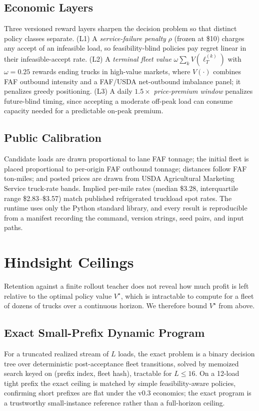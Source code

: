 \documentclass[numbered]{trbunofficial}
\begin{document}
\subsection{Economic Layers}
Three versioned reward layers sharpen the decision problem so that distinct
policy classes separate. (L1) A \textit{service-failure penalty} $\rho$
(frozen at \$10) charges any accept of an infeasible load, so
feasibility-blind policies pay regret linear in their infeasible-accept
rate. (L2) A \textit{terminal fleet value} $\omega \sum_k V(\ell^{(k)}_T)$
with $\omega=0.25$ rewards ending trucks in high-value markets, where
$V(\cdot)$ combines FAF outbound intensity and a FAF/USDA net-outbound
imbalance panel; it penalizes greedy positioning. (L3) A daily
$1.5\times$ \textit{price-premium window} penalizes future-blind timing,
since accepting a moderate off-peak load can consume capacity needed for a
predictable on-peak premium.

\subsection{Public Calibration}
Candidate loads are drawn proportional to lane FAF tonnage; the initial
fleet is placed proportional to per-origin FAF outbound tonnage; distances
follow FAF ton-miles; and posted prices are drawn from USDA Agricultural
Marketing Service truck-rate bands. Implied per-mile rates (median \$3.28,
interquartile range \$2.83--\$3.57) match published refrigerated truckload
spot rates. The runtime uses only the Python standard library, and every
result is reproducible from a manifest recording the command, version
strings, seed pairs, and input paths.

\section{Hindsight Ceilings}
Retention against a finite rollout teacher does not reveal how much profit
is left relative to the optimal policy value $V^\star$, which is
intractable to compute for a fleet of dozens of trucks over a continuous
horizon. We therefore bound $V^\star$ from above.

\subsection{Exact Small-Prefix Dynamic Program}
For a truncated realized stream of $L$ loads, the exact problem is a binary
decision tree over deterministic post-acceptance fleet transitions, solved
by memoized search keyed on (prefix index, fleet hash), tractable for
$L \leq 16$. On a 12-load tight prefix the exact ceiling is matched by
simple feasibility-aware policies, confirming short prefixes are flat under
the v0.3 economics; the exact program is a trustworthy small-instance
reference rather than a full-horizon ceiling.
\end{document}
